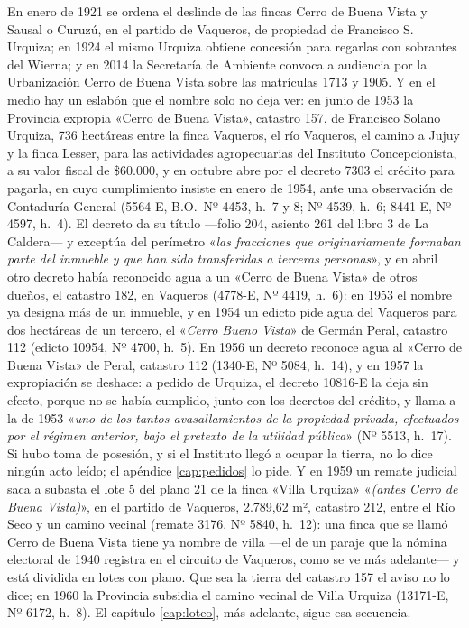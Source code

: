 En enero de 1921 se ordena el deslinde de las fincas Cerro de Buena Vista y Sausal o Curuzú, en el partido de Vaqueros, de propiedad de Francisco S. Urquiza; en 1924 el mismo Urquiza obtiene concesión para regarlas con sobrantes del Wierna; y en 2014 la Secretaría de Ambiente convoca a audiencia por la Urbanización Cerro de Buena Vista sobre las matrículas 1713 y 1905. Y en el medio hay un eslabón que el nombre solo no deja ver: en junio de 1953 la Provincia expropia «Cerro de Buena Vista», catastro 157, de Francisco Solano Urquiza, 736 hectáreas entre la finca Vaqueros, el río Vaqueros, el camino a Jujuy y la finca Lesser, para las actividades agropecuarias del Instituto Concepcionista, a su valor fiscal de \$60.000, y en octubre abre por el decreto 7303 el crédito para pagarla, en cuyo cumplimiento insiste en enero de 1954, ante una observación de Contaduría General (5564-E, B.O.\ Nº 4453, h.\ 7 y 8; Nº 4539, h.\ 6; 8441-E, Nº 4597, h.\ 4). El decreto da su título ---folio 204, asiento 261 del libro 3 de La Caldera--- y exceptúa del perímetro «\textit{las fracciones que originariamente formaban parte del inmueble y que han sido transferidas a terceras personas}», y en abril otro decreto había reconocido agua a un «Cerro de Buena Vista» de otros dueños, el catastro 182, en Vaqueros (4778-E, Nº 4419, h.\ 6): en 1953 el nombre ya designa más de un inmueble, y en 1954 un edicto pide agua del Vaqueros para dos hectáreas de un tercero, el «\textit{Cerro Bueno Vista}» de Germán Peral, catastro 112 (edicto 10954, Nº 4700, h.\ 5). En 1956 un decreto reconoce agua al «Cerro de Buena Vista» de Peral, catastro 112 (1340-E, Nº 5084, h.\ 14), y en 1957 la expropiación se deshace: a pedido de Urquiza, el decreto 10816-E la deja sin efecto, porque no se había cumplido, junto con los decretos del crédito, y llama a la de 1953 «\textit{uno de los tantos avasallamientos de la propiedad privada, efectuados por el régimen anterior, bajo el pretexto de la utilidad pública}» (Nº 5513, h.\ 17). Si hubo toma de posesión, y si el Instituto llegó a ocupar la tierra, no lo dice ningún acto leído; el apéndice \ref{cap:pedidos} lo pide. Y en 1959 un remate judicial saca a subasta el lote 5 del plano 21 de la finca «Villa Urquiza» «\textit{(antes Cerro de Buena Vista)}», en el partido de Vaqueros, 2.789,62 m², catastro 212, entre el Río Seco y un camino vecinal (remate 3176, Nº 5840, h.\ 12): una finca que se llamó Cerro de Buena Vista tiene ya nombre de villa ---el de un paraje que la nómina electoral de 1940 registra en el circuito de Vaqueros, como se ve más adelante--- y está dividida en lotes con plano. Que sea la tierra del catastro 157 el aviso no lo dice; en 1960 la Provincia subsidia el camino vecinal de Villa Urquiza (13171-E, Nº 6172, h.\ 8). El capítulo \ref{cap:loteo}, más adelante, sigue esa secuencia.

